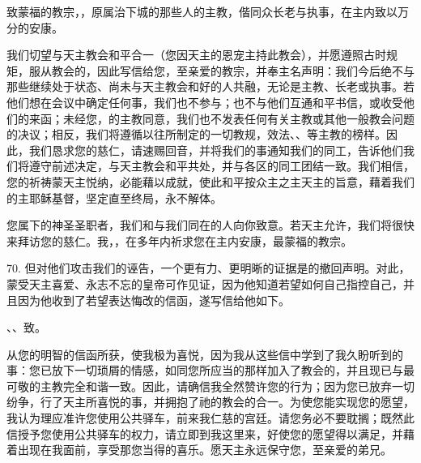 致蒙福的教宗，，原属治下城的那些人的主教，偕同众长老与执事，在主内致以万分的安康。\par

我们切望与天主教会和平合一（您因天主的恩宠主持此教会），并愿遵照古时规矩，服从教会的，因此写信给您，至亲爱的教宗，并奉主名声明：我们今后绝不与那些继续处于状态、尚未与天主教会和好的人共融，无论是主教、长老或执事。若他们想在会议中确定任何事，我们也不参与；也不与他们互通和平书信，或收受他们的来函；未经您，的主教同意，我们也不发表任何有关主教或其他一般教会问题的决议；相反，我们将遵循以往所制定的一切教规，效法、、等主教的榜样。因此，我们恳求您的慈仁，请速赐回音，并将我们的事通知我们的同工，告诉他们我们将遵守前述决定，与天主教会和平共处，并与各区的同工团结一致。我们相信，您的祈祷蒙天主悦纳，必能藉以成就，使此和平按众主之主天主的旨意，藉着我们的主耶稣基督，坚定直至终局，永不解体。\par

您属下的神圣圣职者，我们和与我们同在的人向你致意。若天主允许，我们将很快来拜访您的慈仁。我，，在多年内祈求您在主内安康，最蒙福的教宗。\par

70. 但对他们攻击我们的诬告，一个更有力、更明晰的证据是的撤回声明。对此，蒙受天主喜爱、永志不忘的皇帝可作见证，因为他知道若望如何自己指控自己，并且因为他收到了若望表达悔改的信函，遂写信给他如下。\par

、、致。\par

从您的明智的信函所获，使我极为喜悦，因为我从这些信中学到了我久盼听到的事：您已放下一切琐屑的情感，如同您所应当的那样加入了教会的，并且现已与最可敬的主教完全和谐一致。因此，请确信我全然赞许您的行为；因为您已放弃一切纷争，行了天主所喜悦的事，并拥抱了祂的教会的合一。为使您能实现您的愿望，我认为理应准许您使用公共驿车，前来我仁慈的宫廷。请您务必不要耽搁；既然此信授予您使用公共驿车的权力，请立即到我这里来，好使您的愿望得以满足，并藉着出现在我面前，享受那您当得的喜乐。愿天主永远保守您，至亲爱的弟兄。\par


